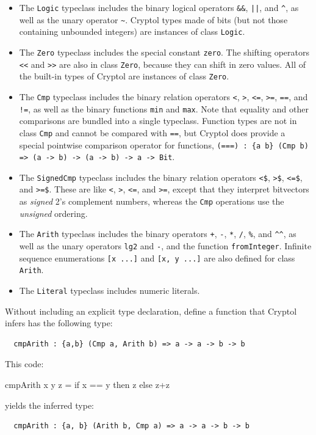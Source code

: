 \begin{itemize}
\item
The \texttt{Logic} typeclass includes the binary logical operators
\texttt{\&\&}, \texttt{||}, and \verb+^+, as well as the unary
operator \verb+~+. Cryptol types made of bits (but not those
containing unbounded integers) are instances of class \texttt{Logic}.

\item
The \texttt{Zero} typeclass includes the special constant
\texttt{zero}. The shifting operators \texttt{<<} and \texttt{>>} are
also in class \texttt{Zero}, because they can shift in zero values.
All of the built-in types of Cryptol are instances of class
\texttt{Zero}.

\item
The \texttt{Cmp} typeclass includes the binary relation operators
\texttt{<}, \texttt{>}, \texttt{<=}, \texttt{>=}, \texttt{==}, and
\texttt{!=}, as well as the binary functions \texttt{min} and
\texttt{max}. Note that equality and other comparisons are bundled
into a single typeclass. Function types are not in class \texttt{Cmp}
and cannot be compared with \texttt{==}, but Cryptol does provide a
special pointwise comparison operator for functions, \texttt{(===) :
  \{a b\} (Cmp b) => (a -> b) -> (a -> b) -> a -> Bit}.

\item
The \texttt{SignedCmp} typeclass includes the binary relation
operators \texttt{<\$}, \texttt{>\$}, \texttt{<=\$}, and
\texttt{>=\$}. These are like \texttt{<}, \texttt{>}, \texttt{<=}, and
\texttt{>=}, except that they interpret bitvectors as \emph{signed}
2's complement numbers, whereas the \texttt{Cmp} operations use the
\emph{unsigned} ordering.

\item
The \texttt{Arith} typeclass includes the binary operators \texttt{+},
\texttt{-}, \texttt{*}, \texttt{/}, \verb+%+, and \verb+^^+, as well
as the unary operators \texttt{lg2} and \texttt{-}, and the function
\texttt{fromInteger}. Infinite sequence enumerations \texttt{[x ...]}
and \texttt{[x, y ...]} are also defined for class \texttt{Arith}.

\item
The \texttt{Literal} typeclass includes numeric literals.
\end{itemize}

\begin{Exercise}\label{ex:tvar:1}
  Without including an explicit type declaration, define a function
  that Cryptol infers has the following type:
\begin{Verbatim}
  cmpArith : {a,b} (Cmp a, Arith b) => a -> a -> b -> b
\end{Verbatim}
\end{Exercise}
\begin{Answer}
This code:
\begin{code}
  cmpArith x y z = if x == y then z else z+z
\end{code}
yields the inferred type:
\begin{Verbatim}
  cmpArith : {a, b} (Arith b, Cmp a) => a -> a -> b -> b
\end{Verbatim}
\end{Answer}

